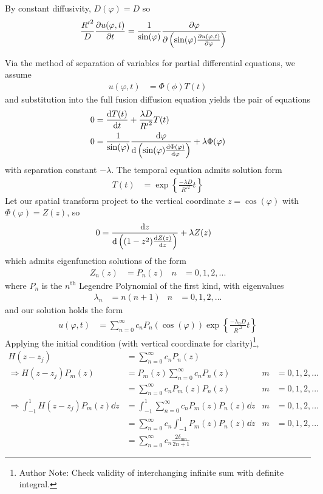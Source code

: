 \documentclass{report}
\newcommand\Par[1]{{ \left({#1}\right) }}
\newcommand\Brace[1]{{ \left\{{#1}\right\} }}
\newcommand\R{{ R' }}
\begin{document}
By constant diffusivity, $D(\varphi) = D$ so
\begin{align*}
	\frac{\R^2}{D} \pdv{u(\varphi, t)}{t} &= \frac{1}{\sin(\varphi)}\pdv\varphi\Par{\sin(\varphi) \pdv{u(\varphi, t)}{\varphi}}
\end{align*}

Via the method of separation of variables for partial differential equations, we assume
\begin{align*}
	u(\varphi, t) &= \Phi(\phi) T(t)
\end{align*}
and substitution into the full fusion diffusion equation yields the pair of equations
\begin{align*}
	0 &= \dv{T(t)}{t} + \frac{\lambda D}{\R^2} T(t) \\
	0 &= \frac{1}{\sin(\varphi)} \dv{\varphi}\Par{\sin(\varphi) \dv{\Phi(\varphi)}{\varphi}} + \lambda \Phi(\varphi)
\end{align*}
with separation constant $-\lambda$. The temporal equation admits solution form
\begin{align*}
	T(t) &= \exp\Brace{\frac{-\lambda D}{\R^2} t}
\end{align*}
Let our spatial transform project to the vertical coordinate $z = \cos(\varphi)$ with $\Phi(\varphi) = Z(z)$, so
\begin{align*}
	0 &= \dv{z}\Par{\Par{1 - z^2} \dv{Z(z)}{z}} + \lambda Z(z)
\end{align*}
which admits eigenfunction solutions of the form
\begin{align*}
	Z_n(z) &= P_n(z) & n &= 0, 1, 2, ...
\end{align*}
where $P_n$ is the $n^\text{th}$ Legendre Polynomial of the first kind, with eigenvalues
\begin{align*}
	\lambda_n &= n \Par{n + 1} & n &= 0, 1, 2, ...
\end{align*}
and our solution holds the form
\begin{align*}
	u(\varphi, t) &= \sum_{n = 0}^\infty c_n P_n\Par{\cos(\varphi)} \exp\Brace{\frac{-\lambda_n D}{\R^2} t}
\end{align*}
Applying the initial condition (with vertical coordinate for clarity)\footnote{Author Note: Check validity of interchanging infinite sum with definite integral.},
\begin{align*}
	H(z - z_j) &= \sum_{n = 0}^\infty c_n P_n(z) \\
	\Rightarrow H(z - z_j) P_m(z) &= P_m(z) \sum_{n = 0}^\infty c_n P_n(z) & m &= 0, 1, 2, ... \\
	&= \sum_{n = 0}^\infty c_n P_m(z) P_n(z) & m &= 0, 1, 2, ... \\
	\Rightarrow \int_{-1}^1 H(z - z_j) P_m(z) \dd{z} &= \int_{-1}^1 \sum_{n = 0}^\infty c_n P_m(z) P_n(z) \dd{z} & m &= 0, 1, 2, ... \\
	&= \sum_{n=0}^\infty c_n \int_{-1}^1 P_m(z) P_n(z) \dd{z} & m &= 0, 1, 2, ... \\
	&= \sum_{n=0}^\infty c_n \frac{2 \delta_{mn}}{2n + 1}
\end{align*}
\end{document}
